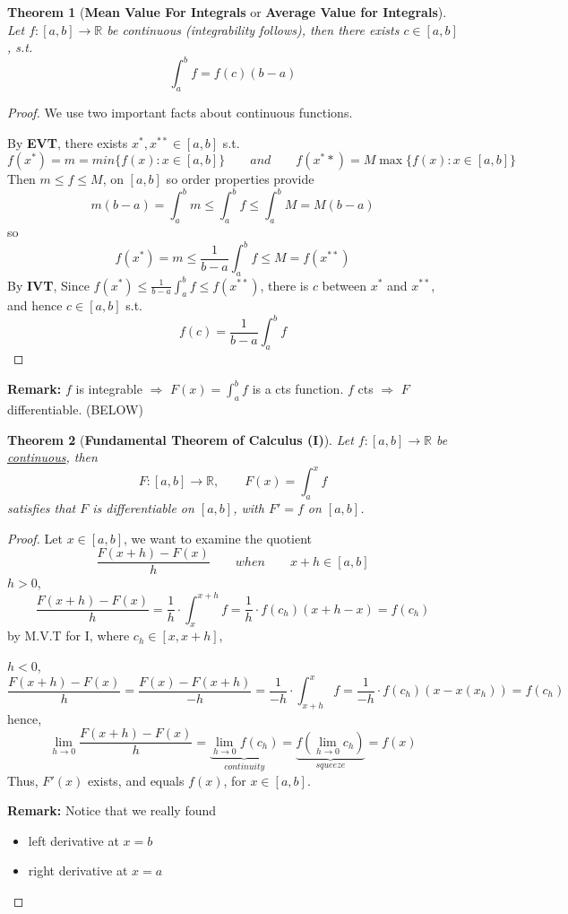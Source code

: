 \documentclass[12pt]{article}
\theoremstyle{plain}
\newtheorem{theorem}{Theorem}[subsection]
\newcommand{\mR}{{\mathbb{R}}}
\begin{document}
	\begin{theorem}[\textbf{Mean Value For Integrals} or \textbf{Average Value
		for Integrals}]
		Let $f:[a,b]\to\mR$ be continuous (integrability follows), then there
		exists $c\in [a,b]$, s.t. 
		\[
			\int_a^b f = f(c) (b-a)
		\]
	\end{theorem}
	\begin{proof}
		We use two important facts about continuous functions. 
		
		By \textbf{EVT}, there exists $x^*, x^{**} \in [a,b]$ s.t.
		\[
			f(x^*) = m = min \{f(x) : x\in [a,b]\} \qquad and \qquad
			f(x^**) = M \max\{f(x) : x \in [a,b]\} 
		\]
		Then $m\leq f\leq M$, on $[a,b]$ so order properties provide
		\[
			m(b-a) =\int_a^b m\leq \int_a^b f \leq \int_a^b M = M(b-a)
		\]
		so 
		\[
			f(x^*) = m\leq \frac1{b-a} \int_a^b f \leq M = f(x^{**})
		\]
		By \textbf{IVT}, Since $f(x^*) \leq \frac1{b-a}\int_a^b f
		\leq f(x^{**})$, there is $c$ between $x^*$ and $x^{**}$, and 
		hence $c\in[a,b]$ s.t. 
		\[
			f(c) = \frac1{b-a} \int_a^b f
		\]
	\end{proof}

	{\color{brown}
	\textbf{Remark:}
	$f$ is integrable $\Rightarrow$ $F(x) = \int_a^b f$ is a cts function. 
	$f$ cts $\Rightarrow$ $F$ differentiable. (BELOW) }\\
		
	\begin{theorem}[\textbf{Fundamental Theorem of Calculus (I)}]
		Let $f:[a,b]\to \mR$ be \underline{continuous}, then 
		\[
			F:[a,b] \to \mR, \qquad F(x) = \int_a^x f
		\]
		satisfies that $F$ is differentiable on $[a,b]$, with $F' = f$ 
		on $[a,b]$.
	\end{theorem}
	\begin{proof}
		Let $x\in[a,b]$, we want to examine the quotient 
		\[
			\frac{F(x+h)-F(x)}h \qquad when \qquad x+h \in [a,b]
		\]
		\underline{$h>0$}, 
		\[
			\frac{F(x+h)-F(x)}h=\frac 1h \cdot \int_x^{x+h} f = 
			\frac1h \cdot f(c_h) (x+h-x)=f(c_h) 
		\]
		by M.V.T for I, where $c_h \in [x, x+h]$, 

		\underline{$h<0$}, 
		\[
			\frac{F(x+h)-F(x)}h = \frac{F(x)-F(x+h)}{-h}
			= \frac1{-h} \cdot \int_{x+h}^x f
			= \frac1{-h}\cdot  f(c_h)(x-x(x_h))
			=f(c_h)
		\]
		hence, 
		\[
			\lim_{h\to 0} \frac{F(x+h)-F(x)}h 
			=\underbrace{\lim_{h\to 0} f(c_h)}_{continuity}	
			=\underbrace{f(\lim_{h\to 0}c_h)}_{squeeze}= f(x)
		\]
		Thus, $F'(x)$ exists, and equals $f(x)$, for $x\in [a,b]$. \\
		
		{\color{brown}
		\textbf{Remark:} Notice that we really found 
		\begin{itemize}
			\item left derivative at $x=b$
			\item right derivative at $x=a$
		\end{itemize}}
	\end{proof}
\end{document}
